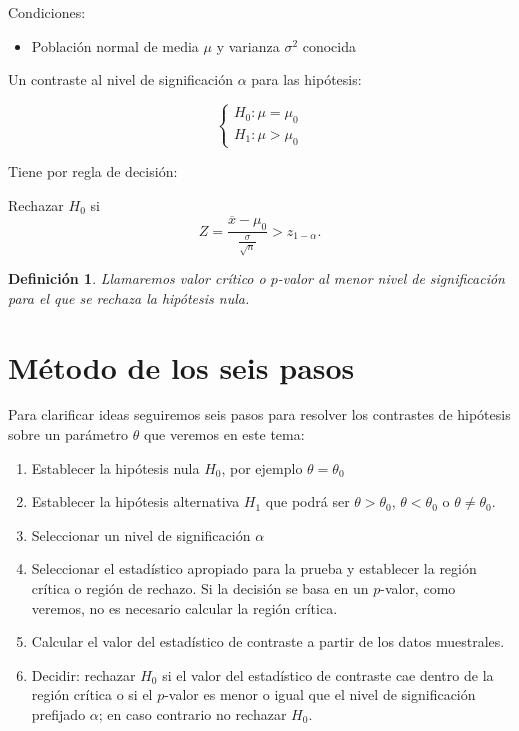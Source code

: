 \documentclass[12pt]{report}
\newtheorem{definition}{Definici\'on}
\begin{document}
    Condiciones:
    \begin{itemize}
    \item Población normal de media $\mu$ y varianza $\sigma^2$
    conocida
    \end{itemize}

    Un contraste al nivel de significación $\alpha$ para las
    hipótesis:

   $$\left\{\begin{array}{l}
    H_{0}:\mu=\mu_{0}\\
    H_{1}:\mu>\mu_{0}
    \end{array}\right.$$


    Tiene por regla de decisión:

    Rechazar $H_{0}$ si
    $$Z=
    \frac{\overline{x}-\mu_{0}}{\frac{\sigma}{\sqrt{n}}}>z_{1-\alpha}.$$

    \begin{definition}
Llamaremos valor crítico o  $p$-valor al menor nivel de significación para el que se
rechaza la hipótesis nula.
\end{definition}

    \section{Método de los seis pasos}
  Para clarificar ideas seguiremos seis pasos para resolver los
  contrastes de hipótesis sobre un parámetro $\theta$
  que veremos en este tema:

  \begin{enumerate}[1)]
      \item Establecer la hipótesis nula $H_{0}$, por ejemplo
      $\theta=\theta_{0}$
      \item Establecer la hipótesis alternativa $H_{1}$ que podrá ser
      $\theta>\theta_{0}$,  $\theta<\theta_{0}$ o
      $\theta\not=\theta_{0}$.
      \item Seleccionar un nivel de significación $\alpha$
      \item Seleccionar el estadístico apropiado para la prueba y
      establecer la región crítica o región de rechazo. Si la
      decisión se basa en un $p$-valor, como veremos, no es necesario
      calcular la región crítica.
      \item Calcular el valor del estadístico de contraste a partir
      de los datos muestrales.
      \item Decidir:  rechazar $H_{0}$ si el valor del estadístico de
      contraste cae dentro de la región crítica o si el $p$-valor es
      menor o igual que el nivel de significación prefijado $\alpha$;
      en caso contrario no rechazar $H_{0}$.
      \end{enumerate}
\end{document}
